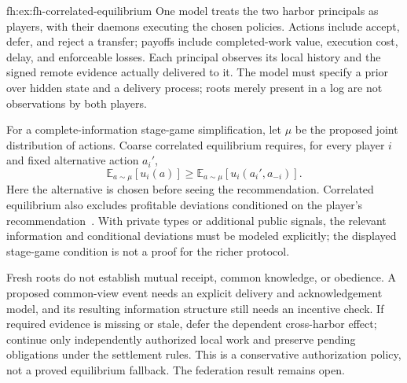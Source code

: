 \begin{pdSolution}{fh:ex:fh-correlated-equilibrium}
One model treats the two harbor principals as players, with their daemons executing the chosen policies. Actions include accept, defer, and reject a transfer; payoffs include completed-work value, execution cost, delay, and enforceable losses. Each principal observes its local history and the signed remote evidence actually delivered to it. The model must specify a prior over hidden state and a delivery process; roots merely present in a log are not observations by both players.

For a complete-information stage-game simplification, let $\mu$ be the proposed joint distribution of actions. Coarse correlated equilibrium requires, for every player $i$ and fixed alternative action $a_i'$,
\[
  \mathbb{E}_{a\sim\mu}[u_i(a)]
  \ge
  \mathbb{E}_{a\sim\mu}[u_i(a_i',a_{-i})].
\]
Here the alternative is chosen before seeing the recommendation. Correlated equilibrium also excludes profitable deviations conditioned on the player's recommendation~. With private types or additional public signals, the relevant information and conditional deviations must be modeled explicitly; the displayed stage-game condition is not a proof for the richer protocol.

Fresh roots do not establish mutual receipt, common knowledge, or obedience. A proposed common-view event needs an explicit delivery and acknowledgement model, and its resulting information structure still needs an incentive check. If required evidence is missing or stale, defer the dependent cross-harbor effect; continue only independently authorized local work and preserve pending obligations under the settlement rules. This is a conservative authorization policy, not a proved equilibrium fallback. The federation result remains open.
\end{pdSolution}
